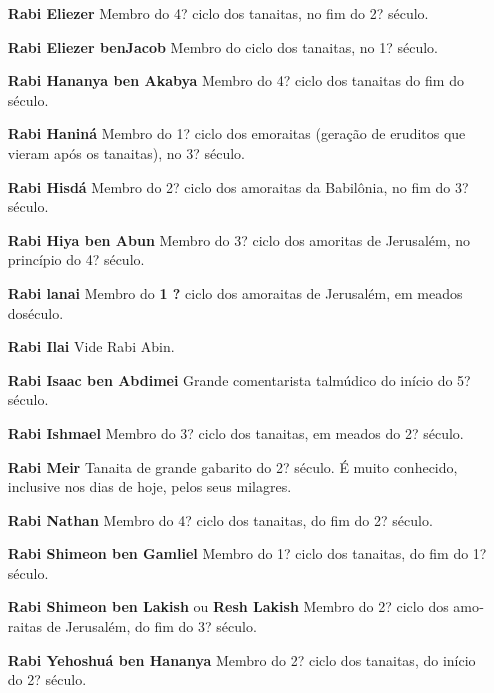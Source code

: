 \begin{itemize}
\item[\textbf{Rabi Eliezer}] Membro do 4? ciclo dos tanaitas, no fim do 2?
século.

\item[\textbf{Rabi Eliezer benJacob}] Membro do
ciclo dos tanaitas, no 1? século.

\item[\textbf{Rabi Hananya ben Akabya}] Mem­bro do 4? ciclo dos tanaitas do fim do século.

\item[\textbf{Rabi Haniná}] Membro do 1? ciclo dos emoraitas (geração de
eruditos que vieram após os tanaitas), no 3? século.

\item[\textbf{Rabi Hisdá}] Membro do 2? ciclo dos amoraitas da Babilônia, no fim do 3? século.

\item[\textbf{Rabi Hiya ben Abun}] Membro do 3? ciclo dos amoritas de
Jerusalém, no princípio do 4? século.

\item[\textbf{Rabi lanai} Membro do \textbf{1 ?}] ciclo dos
amoraitas de Jerusalém, em meados doséculo.

\item[\textbf{Rabi Ilai}] Vide Rabi Abin.

\item[\textbf{Rabi Isaac ben Abdimei}] Grande co­mentarista talmúdico do
início do 5? século.

\item[\textbf{Rabi Ishmael}] Membro do 3? ciclo dos tanaitas, em meados do 2?
século.

\item[\textbf{Rabi Meir}] Tanaita de grande gabari­to do 2? século. É
muito conhecido, inclusive nos dias de hoje, pelos seus milagres.

\item[\textbf{Rabi Nathan}] Membro do 4? ciclo dos tanaitas, do fim do 2?
século.

\item[\textbf{Rabi Shimeon ben Gamliel}] Mem­bro do 1? ciclo dos
tanaitas, do fim do 1? século.

\item[\textbf{Rabi Shimeon ben Lakish} ou \textbf{Resh Lakish}] Membro do 2?
ciclo dos amo­raitas de Jerusalém, do fim do 3? sé­culo.

\item[\textbf{Rabi Yehoshuá ben Hananya}] Membro do 2? ciclo dos tanaitas, do
início do 2? século.


\end{itemize}

